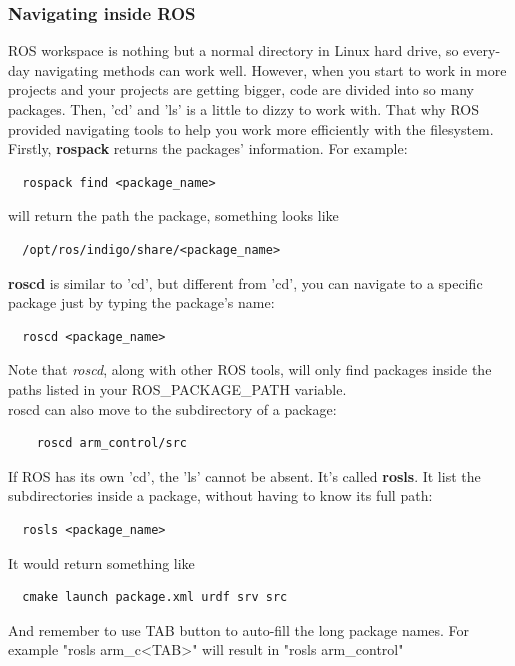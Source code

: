\documentclass[pdftex,12pt,a4paper]{article}
\begin{document}
  \subsubsection{Navigating inside ROS}
  ROS workspace is nothing but a normal directory in Linux hard drive, so every-day navigating methods can work well. However, when you start to work in more projects and your projects are getting bigger, code are divided into so many packages. Then, 'cd' and 'ls' is a little to dizzy to work with. That why ROS provided navigating tools to help you work more efficiently with the filesystem. \\
  Firstly, \textbf{rospack} returns the packages' information. For example:
  \begin{lstlisting}
  rospack find <package_name>
  \end{lstlisting}
  will return the path the package, something looks like
  \begin{lstlisting}
  /opt/ros/indigo/share/<package_name>
  \end{lstlisting}
  \textbf{roscd} is similar to 'cd', but different from 'cd', you can navigate to a specific package just by typing the package's name:
  \begin{lstlisting}
  roscd <package_name>
  \end{lstlisting}
  Note that \textit{roscd}, along with other ROS tools, will only find packages inside the paths listed in your ROS\_PACKAGE\_PATH variable.\\
  roscd can also move to the subdirectory of a package:
  \begin{lstlisting}
    roscd arm_control/src
  \end{lstlisting}
  If ROS has its own 'cd', the 'ls' cannot be absent. It's called \textbf{rosls}. It list the subdirectories inside a package, without having to know its full path:
  \begin{lstlisting}
  rosls <package_name>
  \end{lstlisting}
  It would return something like
  \begin{lstlisting}
  cmake launch package.xml urdf srv src
  \end{lstlisting}
  And remember to use TAB button to auto-fill the long package names. For example "rosls arm\_c\textless TAB\textgreater" will result in "rosls arm\_control"
  
  \newpage
\end{document}
